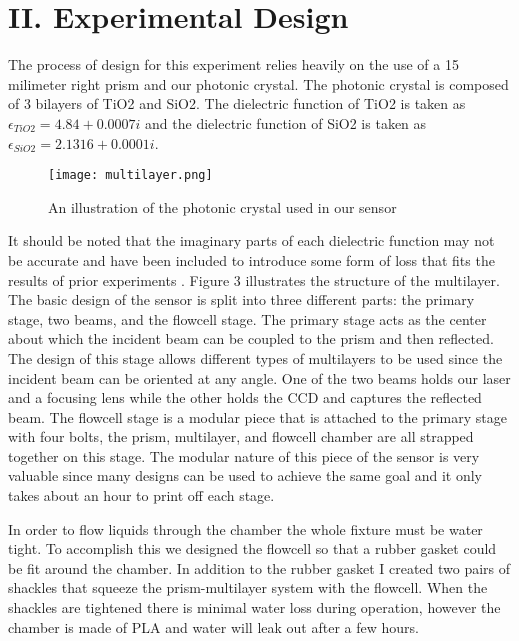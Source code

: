 \section*{\textbf{II. Experimental Design}}

\hspace{0.15in}
The process of design for this experiment relies heavily on the use of a 15 milimeter right prism and our photonic crystal. The photonic crystal is composed of 3 bilayers of TiO2 and SiO2. The dielectric function of TiO2 is taken as $\epsilon_{TiO2} = 4.84 + 0.0007i$ and the dielectric function of SiO2 is taken as $\epsilon_{SiO2} = 2.1316 + 0.0001i$. 

\begin{wrapfigure}{R}{2in}
    \texttt{[image: multilayer.png]}
    \caption{An illustration of the photonic crystal used in our sensor}
    \label{fig:multilayer}
\end{wrapfigure}

It should be noted that the imaginary parts of each dielectric function may not be accurate and have been included to introduce some form of loss that fits the results of prior experiments \cite{}. Figure 3 illustrates the structure of the multilayer.
The basic design of the sensor is split into three different parts: the primary stage, two beams, and the flowcell stage. The primary stage acts as the center about which the incident beam can be coupled to the prism and then reflected. The design of this stage allows different types of multilayers to be used since the incident beam can be oriented at any angle. One of the two beams holds our laser and a focusing lens while the other holds the CCD and captures the reflected beam. The flowcell stage is a modular piece that is attached to the primary stage with four bolts, the prism, multilayer, and flowcell chamber are all strapped together on this stage. The modular nature of this piece of the sensor is very valuable since many designs can be used to achieve the same goal and it only takes about an hour to print off each stage.\\
\vspace{0.1in}

\begin{figure}[h]
\end{figure}

In order to flow liquids through the chamber the whole fixture must be water tight. To accomplish this we designed the flowcell so that a rubber gasket could be fit around the chamber. In addition to the rubber gasket I created two pairs of shackles that squeeze the prism-multilayer system with the flowcell. When the shackles are tightened there is minimal water loss during operation, however the chamber is made of PLA and water will leak out after a few hours.


